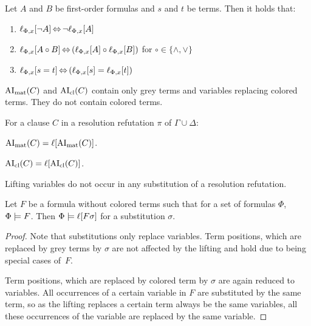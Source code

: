 \documentclass[,%
	paper=a4,%
	DIV10, %
	twoside=false,%
	liststotoc,
	bibtotoc,
	draft=false,%
	numbers=noendperiod
]{scrartcl}
\begin{document}
\begin{lemma}
	\label{lemma:lift_logic_commute}
	Let $A$ and $B$ be first-order formulas and $s$ and $t$ be terms. Then it holds that:
	\begin{enumerate}
		\item $\lift{\Phi}{\lnot A}{x} \semiff{} \lnot \lift{\Phi}{A}{x}$
		\item $\lift{\Phi}{A \circ B}{x} \semiff{} ( \lift{\Phi}{A}{x} \circ \lift{\Phi}{B}{x} )$ for  $\circ \in     \{\land, \lor\}$
		\item $\lift{\Phi}{s = t}{x} \semiff{} ( \lift{\Phi}{s}{x} = \lift{\Phi}{t}{x} )$
	\end{enumerate}
\end{lemma}



\begin{lemma}
	\label{lemma:no_colored_terms}
	$\AImatrix(C)$ and $\AIclause(C)$ contain only grey terms and variables replacing colored terms. They do not contain colored terms.
\end{lemma}



\begin{corr}
	\label{corr:lift_ai}
	For a clause $C$ in a resolution refutation $\pi$ of $\Gamma \cup \Delta$:
	\begin{compactenum}
	\item $\AImatrix(C) = \lifboth{\AImatrix(C)}$.

	\item $\AIclause(C) = \lifboth{\AIclause(C)}$.
	\end{compactenum}
\end{corr}

\begin{lemma}
	\label{lemma:no_lifting_vars_in_subst}
	Lifting variables do not occur in any substitution of a resolution refutation.
\end{lemma}

\begin{lemma}
	\label{lemma:substitute_and_lift}
	Let $F$ be a formula without colored terms such that for a set of formulas $\Phi$, $\Phi \entails F$.
	Then $\Phi \entails \lifboth{F\sigma}$ for a substitution $\sigma$.
\end{lemma}
\begin{proof}
	Note that substitutions only replace variables. Term positions, which are replaced by grey terms by $\sigma$ are not affected by the lifting and hold due to being special cases of~$F$.

	Term positions, which are replaced by colored term by $\sigma$ are again reduced to variables.
	All occurrences of a certain variable in $F$ are substituted by the same term, so as the lifting replaces a certain term always be the same variables, all these occurrences of the variable are replaced by the same variable.
\end{proof}
\end{document}
